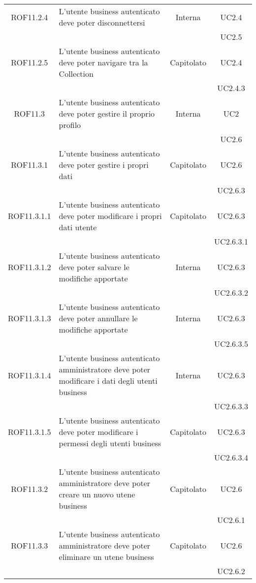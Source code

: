\begin{longtable}{|c|p{6cm}|c|c|}
\midrule
ROF11.2.4
& L'utente business autenticato deve poter disconnettersi
& Interna
& UC2.4\\
& & & UC2.5
\\

\midrule
ROF11.2.5
& L'utente business autenticato deve poter navigare tra la Collection
& Capitolato
& UC2.4\\
& & & UC2.4.3\\

\midrule
ROF11.3
& L'utente business autenticato deve poter gestire il proprio profilo
& Interna
& UC2\\
& & & UC2.6
\\

\midrule
ROF11.3.1
& L'utente business autenticato deve poter gestire i propri dati
& Capitolato
& UC2.6\\
& & & UC2.6.3
\\

\midrule
ROF11.3.1.1
& L'utente business autenticato deve poter modificare i propri dati utente
& Capitolato
& UC2.6.3\\
& & & UC2.6.3.1
\\

\midrule
ROF11.3.1.2
& L'utente business autenticato deve poter  salvare le modifiche apportate
& Interna
& UC2.6.3\\
& & & UC2.6.3.2
\\

\midrule
ROF11.3.1.3
& L'utente business autenticato deve poter annullare le modifiche apportate
& Interna
& UC2.6.3\\
& & & UC2.6.3.5
\\

\midrule
ROF11.3.1.4
& L'utente business autenticato amministratore deve poter modificare i dati degli utenti business
& Interna
& UC2.6.3\\
& & & UC2.6.3.3
\\

\midrule
ROF11.3.1.5
& L'utente business autenticato deve poter modificare i permessi degli utenti business
& Capitolato
& UC2.6.3\\
& & & UC2.6.3.4
\\

\midrule
ROF11.3.2
& L'utente business autenticato amministratore deve poter creare un nuovo utene business
& Capitolato
& UC2.6\\
& & & UC2.6.1
\\

\midrule
ROF11.3.3
& L'utente business autenticato amministratore deve poter eliminare un utene business
& Capitolato
& UC2.6\\
& & & UC2.6.2
\\


\end{longtable}
